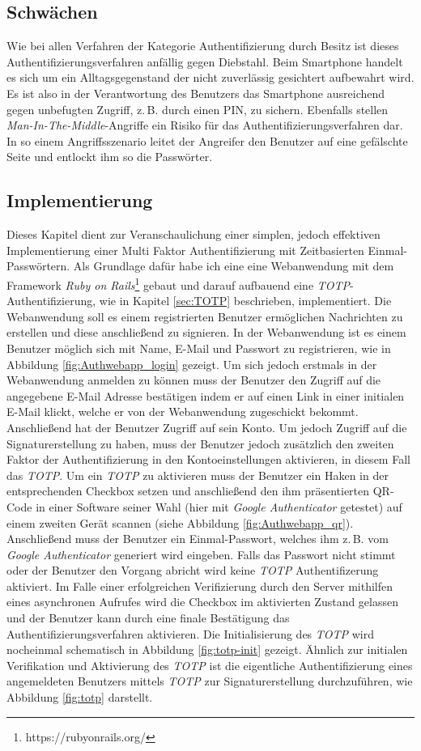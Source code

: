 \documentclass[11pt,a4paper,ngerman]{scrreprt}
\begin{document}
\subsection{Schwächen}
Wie bei allen Verfahren der Kategorie Authentifizierung durch Besitz ist dieses Authentifizierungsverfahren anfällig gegen Diebstahl. Beim Smartphone handelt es sich um ein Alltagsgegenstand der nicht zuverlässig gesichtert aufbewahrt wird. Es ist also in der Verantwortung des Benutzers das Smartphone ausreichend gegen unbefugten Zugriff, z.\,B. durch einen PIN, zu sichern. Ebenfalls stellen \textit{Man-In-The-Middle}-Angriffe ein Risiko für das Authentifizierungsverfahren dar. In so einem Angriffsszenario leitet der Angreifer den Benutzer auf eine gefälschte Seite und entlockt ihm so die Passwörter.

\subsection{Implementierung}
Dieses Kapitel dient zur Veranschaulichung einer simplen, jedoch effektiven Implementierung einer Multi Faktor Authentifizierung mit Zeitbasierten Einmal-Passwörtern. Als Grundlage dafür habe ich eine eine Webanwendung mit dem Framework \textit{Ruby on Rails}\footnote{https://rubyonrails.org/} gebaut und darauf aufbauend eine \textit{TOTP}-Authentifizierung, wie in Kapitel \ref{sec:TOTP} beschrieben, implementiert. Die Webanwendung soll es einem registrierten Benutzer ermöglichen Nachrichten zu erstellen und diese anschließend zu signieren. In der Webanwendung ist es einem Benutzer möglich sich mit Name, E-Mail und Passwort zu registrieren, wie in Abbildung \ref{fig:Authwebapp_login} gezeigt. Um sich jedoch erstmals in der Webanwendung anmelden zu können muss der Benutzer den Zugriff auf die angegebene E-Mail Adresse bestätigen indem er auf einen Link in einer initialen E-Mail klickt, welche er von der Webanwendung zugeschickt bekommt. Anschließend hat der Benutzer Zugriff auf sein Konto. Um jedoch Zugriff auf die Signaturerstellung zu haben, muss der Benutzer jedoch zusätzlich den zweiten Faktor der Authentifizierung in den Kontoeinstellungen aktivieren, in diesem Fall das \textit{TOTP}. Um ein \textit{TOTP} zu aktivieren muss der Benutzer ein Haken in der entsprechenden Checkbox setzen und anschließend den ihm präsentierten QR-Code in einer Software seiner Wahl (hier mit \textit{Google Authenticator} getestet) auf einem zweiten Gerät scannen (siehe Abbildung \ref{fig:Authwebapp_qr}). Anschließend muss der Benutzer ein Einmal-Passwort, welches ihm z.\,B. vom \textit{Google Authenticator} generiert wird eingeben. Falls das Passwort nicht stimmt oder der Benutzer den Vorgang abricht wird keine \textit{TOTP} Authentifizerung aktiviert. Im Falle einer erfolgreichen Verifizierung durch den Server mithilfen eines asynchronen Aufrufes wird die Checkbox im aktivierten Zustand gelassen und der Benutzer kann durch eine finale Bestätigung das Authentifizierungsverfahren aktivieren. Die Initialisierung des \textit{TOTP} wird nocheinmal schematisch in Abbildung \ref{fig:totp-init} gezeigt. Ähnlich zur initialen Verifikation und Aktivierung des \textit{TOTP} ist die eigentliche Authentifizierung eines angemeldeten Benutzers mittels \textit{TOTP} zur Signaturerstellung durchzuführen, wie Abbildung \ref{fig:totp} darstellt.
\end{document}
